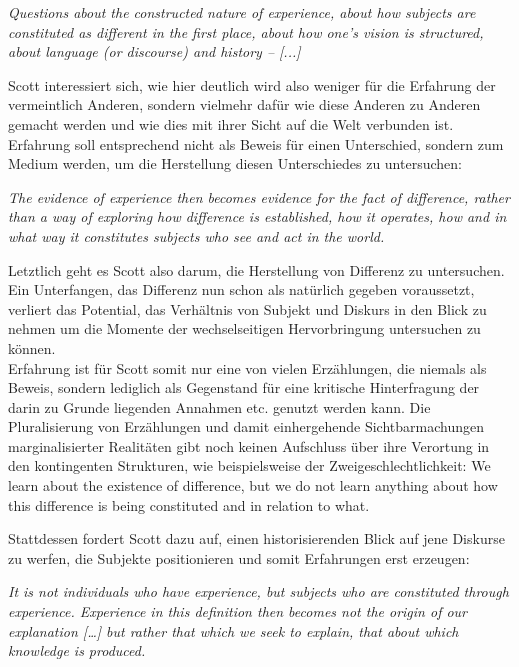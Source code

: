 \begin{myenv}
 \textit{\glqq Questions about the constructed nature of experience, about how
 subjects are constituted as different in the first place, about how one's
vision is structured, about language (or discourse) and history – [...]\grqq}
\footnotemark {}
\end{myenv}

Scott interessiert sich, wie hier deutlich wird also weniger für die Erfahrung
der vermeintlich Anderen, sondern vielmehr dafür wie diese Anderen zu Anderen
gemacht werden und wie dies mit ihrer Sicht auf die Welt verbunden ist.
Erfahrung soll entsprechend nicht als Beweis für einen Unterschied, sondern zum
Medium werden, um die Herstellung diesen Unterschiedes zu untersuchen:
\begin{myenv}
 \textit{\glqq 
  The evidence of experience then becomes evidence for the fact of difference, rather than a way of exploring how difference is established, how it operates, how and in what way it constitutes subjects who see and act in the world. 
  \grqq}
\footnotemark {}
\end{myenv}

Letztlich geht es Scott also darum, die Herstellung von Differenz zu
untersuchen. Ein Unterfangen, das Differenz nun schon als natürlich gegeben
voraussetzt, verliert das Potential, das Verhältnis von Subjekt und Diskurs in
den Blick zu nehmen um die Momente der wechselseitigen Hervorbringung
untersuchen zu können. \\
Erfahrung ist für Scott somit nur eine von vielen
Erzählungen, die niemals als Beweis, sondern lediglich als Gegenstand für eine
kritische Hinterfragung der darin zu Grunde liegenden Annahmen etc. genutzt
werden kann. Die Pluralisierung von Erzählungen und damit einhergehende
Sichtbarmachungen marginalisierter Realitäten gibt noch keinen Aufschluss über
ihre Verortung in den kontingenten Strukturen, wie beispielsweise der
Zweigeschlechtlichkeit: \glqq We learn about the existence of difference, but we do
not learn anything about how this difference is being constituted and in
relation to what.\grqq \footnotemark {}
  
Stattdessen fordert Scott dazu auf, einen historisierenden Blick auf jene Diskurse zu werfen, die Subjekte positionieren und somit Erfahrungen erst erzeugen:

\begin{myenv}
 \textit{\glqq 
It is not individuals who have experience, but subjects who are constituted through experience. Experience in this definition then becomes not the origin of our explanation […] but rather that which we seek to explain, that about which knowledge is produced.
  \grqq}
\footnotemark {}
\end{myenv}

